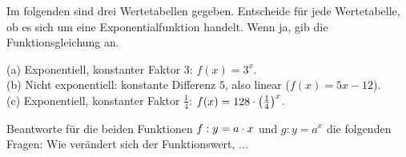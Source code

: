 \documentclass[11pt]{exam}
\begin{document}
\begin{questions}
\question[3]
Im folgenden sind drei Wertetabellen gegeben. Entscheide für jede Wertetabelle, ob es sich um eine Exponentialfunktion handelt. Wenn ja, gib die Funktionsgleichung an.
{\begin{solution}
		(a) Exponentiell, konstanter Faktor $3$: $f(x)=3^x$.\\
		(b) Nicht exponentiell: konstante Differenz $5$, also linear ($f(x)=5x-12$).\\
		(c) Exponentiell, konstanter Faktor $\frac{1}{4}$: $f(x)=128\cdot\left(\frac{1}{4}\right)^x$.
\end{solution}}
{\antwort{6}}


\noaddpoints
\question[\totalpoints]
\addpoints
Beantworte für die beiden Funktionen $f:y=a\cdot x$ und $g:y=a^x$ die folgenden Fragen: Wie verändert sich der Funktionswert, ...
\begin{parts}

\end{parts}
\end{questions}
\end{document}
